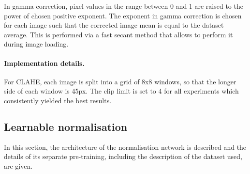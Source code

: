 In gamma correction, pixel values in the range between 0 and 1 are raised to the power of chosen positive exponent. The exponent in gamma correction is chosen for each image such that the corrected image mean is equal to the dataset average. This is performed via a fast secant method that allows to perform it during image loading.

\paragraph{Implementation details.} For CLAHE, each image is split into a grid of 8x8 windows, so that the longer side of each window is 45px. The clip limit is set to 4 for all experiments which consistently yielded the best results.

\subsection{Learnable normalisation}

In this section, the architecture of the normalisation network is described and the details of its separate pre-training, including the description of the dataset used, are given.


